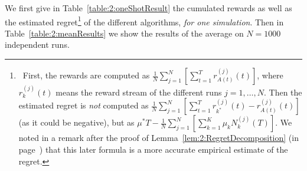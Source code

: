 We first give in Table~\ref{table:2:oneShotResult} the cumulated rewards as well as the estimated regret\footnote{~First, the rewards are computed as $\frac{1}{N} \sum_{j=1}^N [ \sum_{t=1}^T r^{(j)}_{A(t)}(t) ]$, where $r^{(j)}_{k}(t)$ means the reward stream of the different runs $j=1,\dots,N$. Then the estimated regret is \emph{not} computed as $\frac{1}{N} \sum_{j=1}^N [ \sum_{t=1}^T r^{(j)}_{k^*}(t) - r^{(j)}_{A(t)}(t) ]$ (as it could be negative), but as $\mu^* T - \frac{1}{N} \sum_{j=1}^N [ \sum_{k=1}^K \mu_k N^{(j)}_{k}(T) ]$. We noted in a remark after the proof of Lemma~\ref{lem:2:RegretDecomposition} (in page~\pageref{remark:2:moreAccurateCountofRegretForSimulations}) that this later formula is a more accurate empirical estimate of the regret.}
of the different algorithms, \emph{for one simulation}.
Then in Table~\ref{table:2:meanResults} we show the results of the average on $N=1000$ independent runs.



